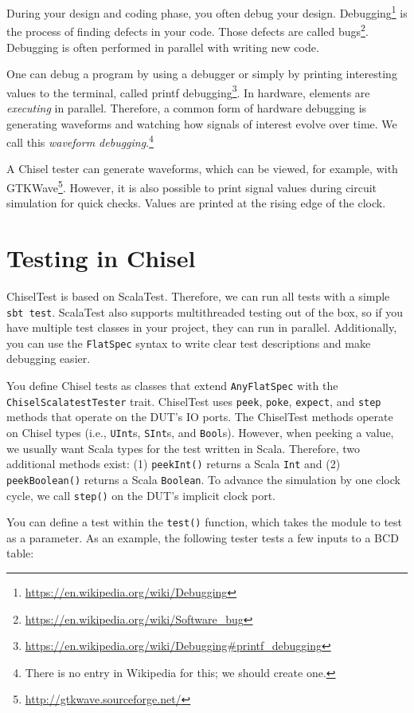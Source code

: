\documentclass[%
    10pt,
    headinclude, footexclude,
    openright, %
    notitlepage,
    cleardoubleempty,
    headsepline,
    pointlessnumbers,
    bibtotoc, idxtotoc,
    ]{scrbook}
\newcommand{\code}[1]{{\lstinline[basicstyle=\small\ttfamily]{#1}}}
\newcommand{\myref}[2]{\href{#1}{#2}}
\renewcommand{\myref}[2]{{#2}{\footnote{\url{#1}}}}
\begin{document}
During your design and coding phase, you often debug your design.
\myref{https://en.wikipedia.org/wiki/Debugging}{Debugging} is the process of
finding defects in your code. Those defects are called
\myref{https://en.wikipedia.org/wiki/Software_bug}{bugs}.
Debugging is often performed in parallel with writing new code.

One can debug a program by using a debugger or simply by printing interesting
values to the terminal, called \myref{https://en.wikipedia.org/wiki/Debugging\#printf\_debugging}{printf debugging}.
In hardware, elements are \emph{executing} in parallel. Therefore, a common form of hardware
debugging is generating waveforms and watching how signals of interest evolve over time.
We call this \emph{waveform debugging}.\footnote{There is no entry in Wikipedia for this;
we should create one.}

A Chisel tester can generate waveforms, which can be viewed, for example, with \myref{http://gtkwave.sourceforge.net/}{GTKWave}.
However, it is also possible to print signal values during circuit simulation for quick checks.
Values are printed at the rising edge of the clock.


\section{Testing in Chisel}

ChiselTest is based on ScalaTest. Therefore, we can run all tests with a simple \code{sbt test}.
ScalaTest also supports multithreaded testing out of the box, so if you have multiple
test classes in your project, they can run in parallel. Additionally, you can use
the \code{FlatSpec} syntax to write clear test descriptions and make debugging easier.

You define Chisel tests as classes that extend \code{AnyFlatSpec} with
the\\ \code{ChiselScalatestTester} trait. ChiselTest uses \code{peek},
\code{poke}, \code{expect}, and \code{step} methods that operate on the DUT's IO ports.
The ChiselTest methods operate on Chisel types (i.e., \code{UInt}s,
\code{SInt}s, and \code{Bool}s). However, when peeking a value, we
usually want Scala types for the test written in Scala.
Therefore, two additional methods exist: (1) \code{peekInt()} returns a
Scala \code{Int} and (2) \code{peekBoolean()} returns a Scala \code{Boolean}.
To advance the simulation by one clock cycle,
we call \code{step()} on the DUT's implicit clock port.

You can define a test within the \code{test()} function, which takes the module to test as
a parameter. As an example, the following tester tests a few inputs to a BCD table:
\end{document}
